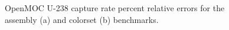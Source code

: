 \begin{figure}[h!]
\begin{subfigure}{0.45\textwidth}
  \caption{}
  \label{fig:colorset-capt-single-step-error}
\end{subfigure}
\caption{OpenMOC U-238 capture rate percent relative errors for the assembly (a) and colorset (b) benchmarks.}
\label{fig:capt-errors}
\end{figure}